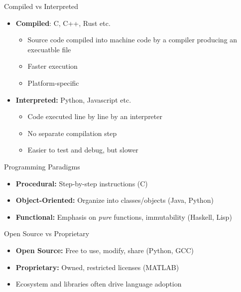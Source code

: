 \documentclass[12pt, aspectratio=169]{beamer}
\begin{document}
    \begin{frame}{Compiled vs Interpreted}
        \begin{itemize}
            \item \textbf{Compiled}: C, C++, Rust etc.
            \begin{itemize}
                \item Source code compiled into machine code by a compiler producing an execuatble file
                \item Faster execution
                \item Platform-specific
            \end{itemize}
            \item \textbf{Interpreted:} Python, Javascript etc.
            \begin{itemize}
                \item Code executed line by line by an interpreter
                \item No separate compilation step
                \item Easier to test and debug, but slower
            \end{itemize}
        \end{itemize}
    \end{frame}


    \begin{frame}{Programming Paradigms}
        \begin{itemize}
            \item \textbf{Procedural:} Step-by-step instructions (C)
            \item \textbf{Object-Oriented:} Organize into classes/objects (Java, Python)
            \item \textbf{Functional:} Emphasis on \emph{pure} functions, immutability (Haskell, Lisp)
        \end{itemize}
    \end{frame}


    \begin{frame}{Open Source vs Proprietary}
        \begin{itemize}
            \item \textbf{Open Source:} Free to use, modify, share (Python, GCC)
            \item \textbf{Proprietary:} Owned, restricted licenses (MATLAB)
            \item Ecosystem and libraries often drive language adoption
        \end{itemize}
    \end{frame}
\end{document}
